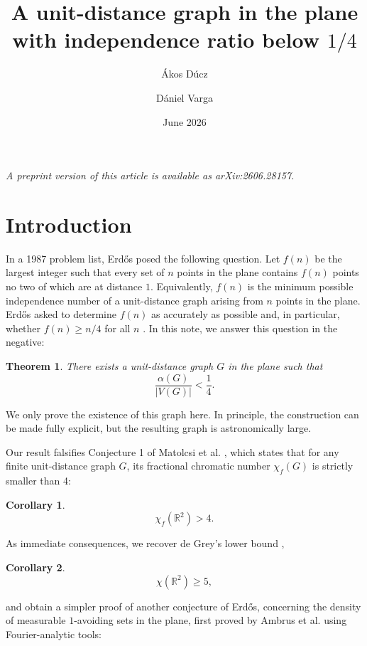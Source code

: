 \documentclass[pdflatex,sn-mathphys-num]{sn-jnl}%
\title[A unit-distance graph in the plane with independence ratio below $1/4$]
{A unit-distance graph in the plane with independence ratio below $1/4$}
\author[1]{Ákos Dúcz}
\author[1]{Dániel Varga}
\affil[1]{\orgname{HUN-REN Alfréd Rényi Institute of Mathematics}, \orgaddress{\city{Budapest}, \country{Hungary}}}
\date{June 2026}
\newtheorem{theorem}{Theorem}[]
\newtheorem{corollary}{Corollary}
\begin{document}
\maketitle

\noindent\textit{A preprint version of this article is available as arXiv:2606.28157.}
\par\medskip


\section{Introduction}

In a 1987 problem list, Erdős posed the following question. Let $f(n)$ be the largest integer such that every set of $n$ points in the plane contains $f(n)$ points no two of which are at distance $1$. Equivalently, $f(n)$ is the minimum possible independence number of a unit-distance graph arising from $n$ points in the plane. Erdős asked to determine $f(n)$ as accurately as possible and, in particular, whether $f(n)\ge n/4$ for all $n$ \cite{Er87}. In this note, we answer this question in the negative:

\begin{theorem}\label{thm1}
There exists a unit-distance graph $G$ in the plane such that
\[
    \frac{\alpha(G)}{|V(G)|}<\frac14.
\]
\end{theorem}

We only prove the existence of this graph here. In principle, the construction can be made fully explicit, but the resulting graph is astronomically large.

Our result falsifies Conjecture 1 of Matolcsi et al. \cite{MRVZ}, which states that for any finite unit-distance graph $G$, its fractional chromatic number $\chi_f(G)$ is strictly smaller than 4:

\begin{corollary}
\[
    \chi_f(\mathbb R^2) > 4.
\]
\end{corollary}

As immediate consequences, we recover de Grey's lower bound \cite{deGrey},
\begin{corollary}
\[
    \chi(\mathbb R^2) \geq 5,
\]
\end{corollary}

and obtain a simpler proof of another conjecture of Erdős, concerning the density of measurable $1$-avoiding sets in the plane, first proved by Ambrus et al. \cite{ACMVZ} using Fourier-analytic tools:
\end{document}
